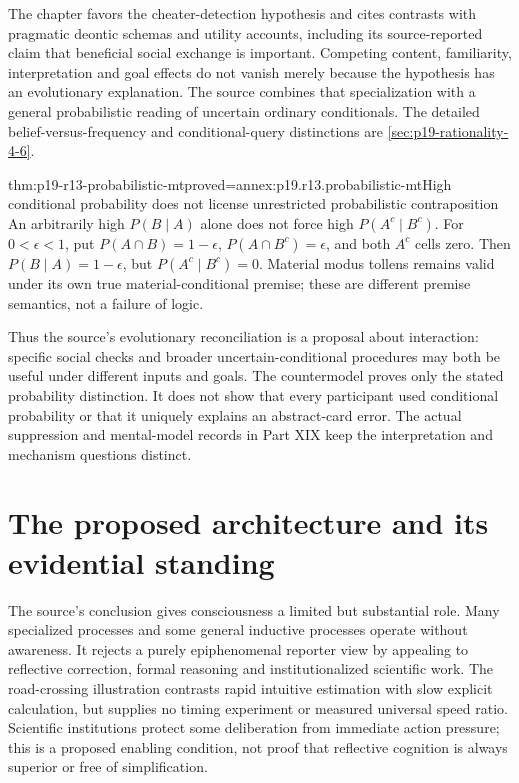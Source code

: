 The chapter favors the cheater-detection hypothesis and cites contrasts with
pragmatic deontic schemas and utility accounts, including its source-reported
claim that beneficial social exchange is important. Competing content,
familiarity, interpretation and goal effects do not vanish merely because
the hypothesis has an evolutionary explanation. The source combines that
specialization with a general probabilistic reading of uncertain ordinary
conditionals. The detailed belief-versus-frequency and conditional-query
distinctions are \cref{sec:p19-rationality-4-6}.

\begin{hblemma}{thm:p19-r13-probabilistic-mt}{proved=annex:p19.r13.probabilistic-mt}{High conditional probability does not license unrestricted probabilistic contraposition}
An arbitrarily high \(P(B\mid A)\) alone does not force high
\(P(A^c\mid B^c)\). For \(0<\epsilon<1\), put
\(P(A\cap B)=1-\epsilon\), \(P(A\cap B^c)=\epsilon\),
and both \(A^c\) cells zero. Then
\(P(B\mid A)=1-\epsilon\), but \(P(A^c\mid B^c)=0\).
Material modus tollens remains valid under its own true material-conditional
premise; these are different premise semantics, not a failure of logic.
\end{hblemma}

Thus the source's evolutionary reconciliation is a proposal about interaction:
specific social checks and broader uncertain-conditional procedures may both
be useful under different inputs and goals. The countermodel proves only
the stated probability distinction. It does not show that every participant
used conditional probability or that it uniquely explains an abstract-card
error. The actual suppression and mental-model records in Part XIX keep
the interpretation and mechanism questions distinct.

\section{The proposed architecture and its evidential standing}
\label{sec:p19-r13-architecture}

The source's conclusion gives consciousness a limited but substantial role.
Many specialized processes and some general inductive processes operate
without awareness. It rejects a purely epiphenomenal reporter view by
appealing to reflective correction, formal reasoning and institutionalized
scientific work. The road-crossing illustration contrasts rapid intuitive
estimation with slow explicit calculation, but supplies no timing experiment
or measured universal speed ratio. Scientific institutions protect some
deliberation from immediate action pressure; this is a proposed enabling
condition, not proof that reflective cognition is always superior or free
of simplification.

